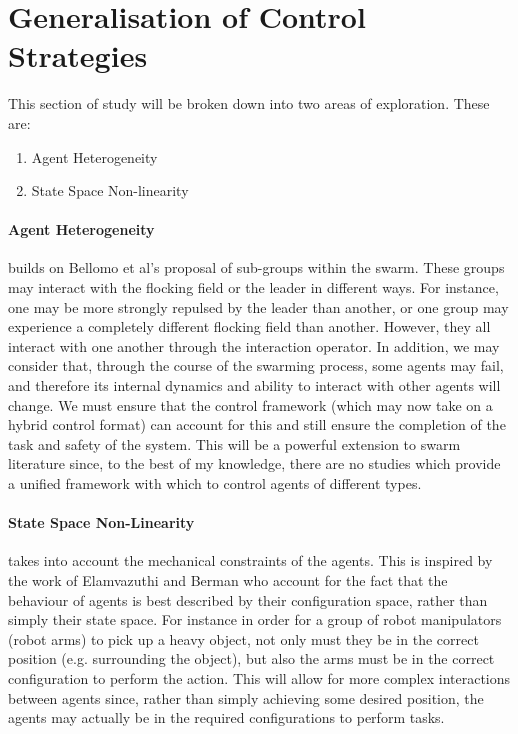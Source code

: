 \documentclass[../sample.tex]{subfiles}
\begin{document}

	\section{Generalisation of Control Strategies} %
	\label{sec:generalisation_of_control_strategies}
	
	This section of study will be broken down into two areas of exploration. These are:

	\begin{enumerate}
		\item Agent Heterogeneity
		\item State Space Non-linearity
	\end{enumerate}

	\paragraph{Agent Heterogeneity} %
	\label{par:agent_heterogeneity}
	
	builds on Bellomo et al's proposal of sub-groups within the swarm. These groups may interact with
	the flocking field or the leader in different ways. For instance, one may be more strongly repulsed
	by the leader than another, or one group may experience a completely different flocking field than
	another. However, they all interact with one another through the interaction operator. In addition,
	we may consider that, through the course of the swarming process, some agents may fail, and
	therefore its internal dynamics and ability to interact with other agents will change. We must
	ensure that the control framework (which may now take on a hybrid control \cite{Lygeros2004}
	format) can account for this and still ensure the completion of the task and safety of the system.
	This will be a powerful extension to swarm literature since, to the best of my knowledge, there are
	no studies which provide a unified framework with which to control agents of different types.


	\paragraph{State Space Non-Linearity} %
	\label{par:state_space_non_linearity}
	
	takes into account the mechanical constraints of the agents. This is inspired by the work of
	Elamvazuthi and Berman \cite{Elamvazuthi2018} who account for the fact that the behaviour of
	agents is best described by their configuration space, rather than simply their state space.
	For instance in order for a group of robot manipulators (robot arms) to pick up a heavy object,
	not only must they be in the correct position (e.g. surrounding the object), but also the arms
	must be in the correct configuration to perform the action. This will allow for more complex
	interactions between agents since, rather than simply achieving some desired position, the
	agents may actually be in the required configurations to perform tasks.
\end{document}
